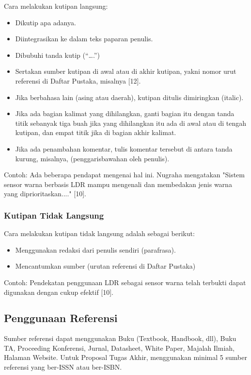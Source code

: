 \documentclass{final_project}
\begin{document}
Cara melakukan kutipan langsung:
\begin{itemize}
    \item Dikutip apa adanya.
    \item Diintegrasikan ke dalam teks paparan penulis.
    \item Dibubuhi tanda kutip (“….”)
    \item Sertakan sumber kutipan di awal atau di akhir kutipan, yakni nomor urut referensi di Daftar Pustaka, misalnya [12].
    \item Jika berbahasa lain (asing atau daerah), kutipan ditulis dimiringkan (italic).
    \item Jika ada bagian kalimat yang dihilangkan, ganti bagian itu dengan tanda titik sebanyak tiga buah jika yang dihilangkan itu ada di awal atau di tengah kutipan, dan empat titik jika di bagian akhir kalimat.
    \item Jika ada penambahan komentar, tulis komentar tersebut di antara tanda kurung, misalnya, (penggarisbawahan oleh penulis).
\end{itemize}

Contoh: Ada beberapa pendapat mengenai hal ini. Nugraha mengatakan "Sistem sensor warna berbasis LDR mampu mengenali dan membedakan jenis warna yang diprioritaskan...." [10].

\subsubsection{Kutipan Tidak Langsung}

Cara melakukan kutipan tidak langsung adalah sebagai berikut:
\begin{itemize}
    \item Menggunakan redaksi dari penulis sendiri (parafrasa).
    \item Mencantumkan sumber (urutan referensi di Daftar Pustaka)
\end{itemize}

Contoh: Pendekatan penggunaan LDR sebagai sensor warna telah terbukti dapat digunakan dengan cukup efektif [10].

\subsection{Penggunaan Referensi}

Sumber referensi dapat menggunakan Buku (Textbook, Handbook, dll), Buku TA, Proceeding Konferensi, Jurnal, Datasheet, White Paper, Majalah Ilmiah, Halaman Website. Untuk Proposal Tugas Akhir, menggunakan minimal 5 sumber referensi yang ber-ISSN atau ber-ISBN.
\end{document}
